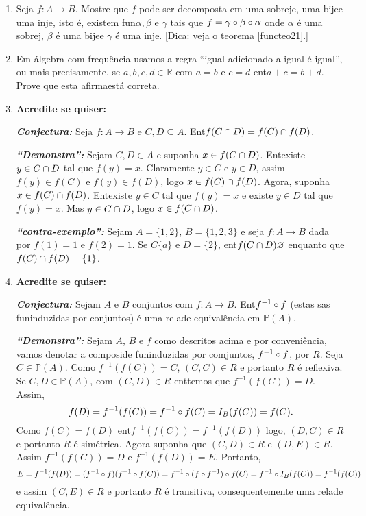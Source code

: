 \begin{enumerate}[{\bf 1.}]
\item Seja $f:A\to B$. Mostre que $f$ pode ser decomposta em uma sobreje\caoi, uma bije\cao e uma inje\caoi, isto \'e, existem fun\coes $\alpha, \beta$ e $\gamma$ tais que $f=\gamma\circ\beta\circ\alpha$ onde $\alpha$ \'e uma sobrej\caoi, $\beta$ \'e uma bije\cao e $\gamma$ \'e uma inje\caoi. [Dica: veja o teorema \ref{functeo21}.]

\item Em \'algebra com frequ\^encia usamos a regra ``igual adicionado a igual \'e igual'', ou mais precisamente, se $a,b,c,d\in\mathbb{R}$ com $a=b$ e $c=d$ ent\ao $a+c=b+d$. Prove que esta afirma\cao est\'a correta.

\item {\bf Acredite se quiser:}  

\noindent \textit{\textbf{Conjectura:}} Seja $f:A\to B$ e $C,D\subseteq A$. Ent\ao $f(C\cap D)=f(C)\cap f(D)$.

\noindent \textit{\textbf{``Demonstra\caoi'':}} Sejam $C,D\in A$ e suponha $x\in f(C\cap D)$. Ent\ao existe $y\in C\cap D$ tal que $f(y)=x$. Claramente $y\in C$ e $y\in D$, assim $f(y)\in f(C)$ e $f(y)\in f(D)$, logo $x\in f(C)\cap f(D)$. Agora, suponha $x\in f(C)\cap f(D)$. Ent\ao existe $y\in C$ tal que $f(y)=x$ e existe $y\in D$ tal que $f(y)=x$. Mas $y\in C\cap D$, logo $x\in f(C\cap D)$. 

\noindent \textit{\textbf{``contra-exemplo'':}} Sejam $A=\{1,2\}$, $B=\{1,2,3\}$ e seja $f:A\to B$ dada por $f(1)=1$ e $f(2)=1$. Se $C\{a\}$ e $D=\{2\}$, ent\ao $f(C\cap D)\varnothing$ enquanto que $f(C)\cap f(D)=\{1\}$. 

\item {\bf Acredite se quiser:}  

\noindent \textit{\textbf{Conjectura:}} Sejam $A$ e $B$ conjuntos com $f:A\to B$. Ent\ao $f^{-1}\circ f$ (estas s\ao as fun\coes induzidas por conjuntos) \'e uma rela\cao de equival\^encia em $\mathbb{P}(A)$.

\noindent \textit{\textbf{``Demonstra\caoi'':}} Sejam $A$, $B$ e $f$ como descritos acima e por conveni\^encia, vamos denotar a composi\cao de fun\coes induzidas por comjuntos, $f^{-1}\circ f$, por $R$. Seja $C\in \mathbb{P}(A)$. Como $f^{-1}(f(C))=C$, $(C,C)\in R$ e portanto $R$ \'e reflexiva. Se $C,D \in \mathbb{P}(A)$, com $(C,D)\in R$ ent\ao temos que $f^{-1}(f(C))=D$. Assim,
\[
f(D)=f^{-1}(f(C))=f^{-1}\circ f(C)=I_B(f(C))=f(C).
\]
Como $f(C)=f(D)$ ent\ao $f^{-1}(f(C))=f^{-1}(f(D))$ logo, $(D,C)\in R$ e portanto $R$ \'e sim\'etrica. Agora suponha que $(C,D)\in R$ e $(D,E)\in R$. Assim $f^{-1}(f(C))=D$ e $f^{-1}(f(D))=E$. Portanto,
\[
E=f^{-1}(f(D))= (f^{-1}\circ f)(f^{-1}\circ f(C))=f^{-1}\circ (f\circ f^{-1})\circ f(C)=f^{-1}\circ I_B(f(C))=f^{-1}(f(C))
\]
e assim $(C,E)\in R$ e portanto $R$ \'e transitiva, consequentemente uma rela\cao de equival\^encia.


\end{enumerate}
